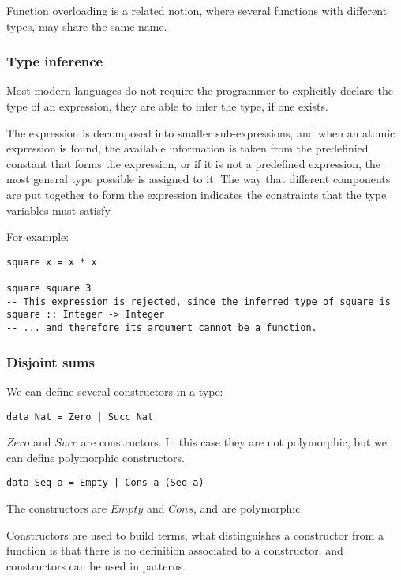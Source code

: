 Function overloading is a related notion, where several functions with different types, may share the same name.

\subsubsection{Type inference}
Most modern languages do not require the programmer to explicitly declare the type of an expression,
they are able to infer the type, if one exists.

The expression is decomposed into smaller sub-expressions, and when an atomic expression is found, the available
information is taken from the predefinied constant that forms the expression, or if it is not a predefined expression,
the most general type possible is assigned to it. The way that different components are put together to form the expression
indicates the constraints that the type variables must satisfy.

For example:
\begin{lstlisting}
square x = x * x

square square 3
-- This expression is rejected, since the inferred type of square is
square :: Integer -> Integer
-- ... and therefore its argument cannot be a function.
\end{lstlisting}

\subsubsection{Disjoint sums}
We can define several constructors in a type:
\begin{lstlisting}
data Nat = Zero | Succ Nat
\end{lstlisting}

$Zero$ and $Succ$ are constructors. In this case they are not polymorphic, but we can define
polymorphic constructors.

\begin{lstlisting}
data Seq a = Empty | Cons a (Seq a)
\end{lstlisting}

The constructors are $Empty$ and $Cons$, and are polymorphic.

Constructors are used to build terms, what distinguishes a constructor from a function is that
there is no definition associated to a constructor, and constructors can be used in patterns.

